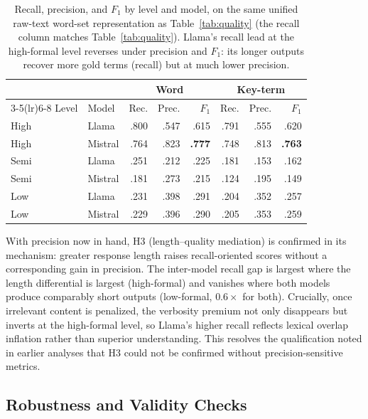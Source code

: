 \documentclass[runningheads]{llncs}
\begin{document}
\begin{table}[htbp]
\centering
\caption{Recall, precision, and $F_1$ by level and model, on the same unified raw-text word-set representation as Table~\ref{tab:quality} (the recall column matches Table~\ref{tab:quality}). Llama's recall lead at the high-formal level reverses under precision and $F_1$: its longer outputs recover more gold terms (recall) but at much lower precision.}
\label{tab:precision}
\setlength{\tabcolsep}{5pt}
\begin{tabular}{llrrrrrr}
\toprule
& & \multicolumn{3}{c}{Word} & \multicolumn{3}{c}{Key-term} \\
\cmidrule(lr){3-5}\cmidrule(lr){6-8}
Level & Model & Rec. & Prec. & $F_1$ & Rec. & Prec. & $F_1$ \\
\midrule
High & Llama   & .800 & .547 & .615 & .791 & .555 & .620 \\
High & Mistral & .764 & .823 & \textbf{.777} & .748 & .813 & \textbf{.763} \\
Semi & Llama   & .251 & .212 & .225 & .181 & .153 & .162 \\
Semi & Mistral & .181 & .273 & .215 & .124 & .195 & .149 \\
Low  & Llama   & .231 & .398 & .291 & .204 & .352 & .257 \\
Low  & Mistral & .229 & .396 & .290 & .205 & .353 & .259 \\
\bottomrule
\end{tabular}
\end{table}

With precision now in hand, H3 (length--quality mediation) is confirmed in its mechanism: greater response length raises recall-oriented scores without a corresponding gain in precision. The inter-model recall gap is largest where the length differential is largest (high-formal) and vanishes where both models produce comparably short outputs (low-formal, $0.6\times$ for both). Crucially, once irrelevant content is penalized, the verbosity premium not only disappears but inverts at the high-formal level, so Llama's higher recall reflects lexical overlap inflation rather than superior understanding. This resolves the qualification noted in earlier analyses that H3 could not be confirmed without precision-sensitive metrics.

\subsection{Robustness and Validity Checks}
\label{sec:within-domain}
\end{document}
